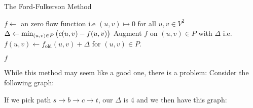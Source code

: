 \begin{algorithm}[H]
    \caption{The Ford-Fulkerson Method}
    \label{ch3:ford-fulkerson}

    \begin{algorithmic}[1]
        \State $f\gets$ an zero flow function \Comment i.e $(u,v)\mapsto 0$ for all $u,v\in V^2$
        \State $\Delta\gets \min_{(u,v)\in P} \del{c(u,v)-f(u,v)}$ 
        \State Augment $f$ on $(u,v)\in P$ with $\Delta$ \Comment i.e. $f(u,v)\gets f_{\text{old}}(u,v)+\Delta$ for $(u,v)\in P$. 
        \EndWhile

        \State \Return $f$ 
        \EndProcedure
    \end{algorithmic}
\end{algorithm}

While this method may seem like a good one, there is a problem:
Consider the following graph:

\begin{center}
\end{center}

If we pick path $s\to b \to c \to t$, our $\Delta$ is $4$ and 
we then have this graph:

\begin{center}
\end{center}